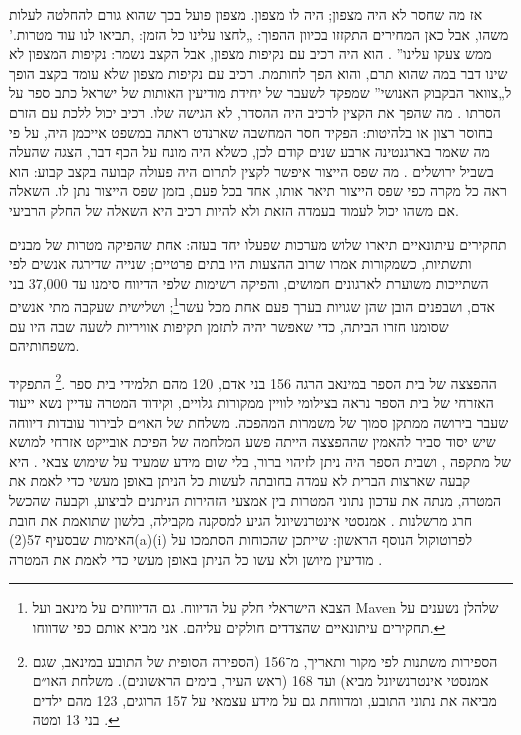 אז מה שחסר לא היה מצפון; היה לו מצפון. מצפון פועל בכך שהוא גורם להחלטה לעלות משהו, אבל כאן המחירים התקזזו בכיוון ההפוך: „לחצו עלינו כל הזמן: ‚תביאו לנו עוד מטרות.’ ממש צעקו עלינו” \autocite{abraham2024lavender}. הוא היה רכיב עם נקיפות מצפון, אבל הקצב נשמר: נקיפות המצפון לא שינו דבר במה שהוא תרם, והוא הפך לחותמת. רכיב עם נקיפות מצפון שלא עומד בקצב הופך ל„צוואר הבקבוק האנושי” שמפקד לשעבר של יחידת מודיעין האותות של ישראל כתב ספר על הסרתו \autocite{ys2021humanmachine}. מה שהפך את הקצין לרכיב היה ההסדר, לא הגישה שלו. רכיב יכול ללכת עם הזרם בחוסר רצון או בלהיטות: הפקיד חסר המחשבה שארנדט ראתה במשפט אייכמן \autocite{arendt1963eichmann} היה, על פי מה שאמר בארגנטינה ארבע שנים קודם לכן, כשלא היה מונח על הכף דבר, הצגה שהעלה בשביל ירושלים \autocite{stangneth2014eichmann}. מה שפס הייצור איפשר לקצין לתרום היה פעולה קבועה בקצב קבוע: הוא ראה כל מקרה כפי שפס הייצור תיאר אותו, אחד בכל פעם, בזמן שפס הייצור נתן לו. השאלה אם משהו יכול לעמוד בעמדה הזאת ולא להיות רכיב היא השאלה של החלק הרביעי.

תחקירים עיתונאיים תיארו שלוש מערכות שפעלו יחד בעזה: אחת שהפיקה מטרות של מבנים ותשתיות, כשמקורות אמרו שרוב ההצעות היו בתים פרטיים; שנייה שדירגה אנשים לפי השתייכות משוערת לארגונים חמושים, והפיקה רשימות שלפי הדיווח סימנו עד 37,000 בני אדם, ושבפנים הובן שהן שגויות בערך פעם אחת מכל עשר\footnote{הצבא הישראלי חלק על הדיווח. גם הדיווחים על מינאב ועל Maven שלהלן נשענים על תחקירים עיתונאיים שהצדדים חולקים עליהם. אני מביא אותם כפי שדווחו.}; ושלישית שעקבה מתי אנשים שסומנו חזרו הביתה, כדי שאפשר יהיה לתזמן תקיפות אוויריות לשעה שבה היו עם משפחותיהם.


ההפצצה של בית הספר במינאב הרגה 156 בני אדם, 120 מהם תלמידי בית ספר \autocite[פס׳~92]{UNFFMIran2026}.\footnote{הספירות משתנות לפי מקור ותאריך, מ־156 (הספירה הסופית של התובע במינאב, שגם אמנסטי אינטרנשיונל מביא) ועד 168 (ראש העיר, בימים הראשונים). משלחת האו״ם מביאה את נתוני התובע, ומדווחת גם על מידע עצמאי על 157 הרוגים, 123 מהם ילדים בני 13 ומטה \autocite[פס׳~92–93]{UNFFMIran2026}.} התפקיד האזרחי של בית הספר נראה בצילומי לוויין ממקורות גלויים, וקידוד המטרה עדיין נשא ייעוד שעבר בירושה ממתקן סמוך של משמרות המהפכה. משלחת של האו״ם לבירור עובדות דיווחה שיש יסוד סביר להאמין שההפצצה הייתה פשע המלחמה של הפיכת אובייקט אזרחי למושא של מתקפה \autocite{ohchr2026minabpress}, ושבית הספר היה ניתן לזיהוי ברור, בלי שום מידע שמעיד על שימוש צבאי \autocite[פס׳~81–86, 124–126]{UNFFMIran2026}. היא קבעה שארצות הברית לא עמדה בחובתה לעשות כל הניתן באופן מעשי כדי לאמת את המטרה, מנתה את עדכון נתוני המטרות בין אמצעי הזהירות הניתנים לביצוע, וקבעה שהכשל חרג מרשלנות \autocite[פס׳~124–125]{UNFFMIran2026}. אמנסטי אינטרנשיונל הגיע למסקנה מקבילה, בלשון שתואמת את חובת האימות שבסעיף 57(2)(a)(i) לפרוטוקול הנוסף הראשון: שייתכן שהכוחות הסתמכו על מודיעין מיושן ולא עשו כל הניתן באופן מעשי כדי לאמת את המטרה \autocite{Amnesty2026Minab}.

